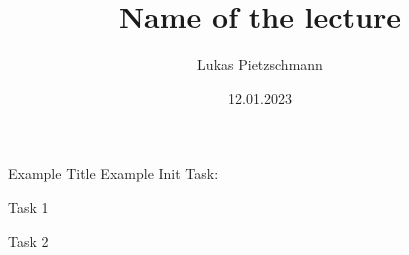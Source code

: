 \documentclass[english, uulm]{exercise}
\title{Name of the lecture}
\author{Lukas Pietzschmann}
\institute{The best institute ever}
\date{12.01.2023}
\begin{document}
	\maketitle

	\begin{exercise}{Example Title}
		Example Init Task:
		\begin{tasks}
			\item Task 1
			\item Task 2
		\end{tasks}
	\end{exercise}
\end{document}
